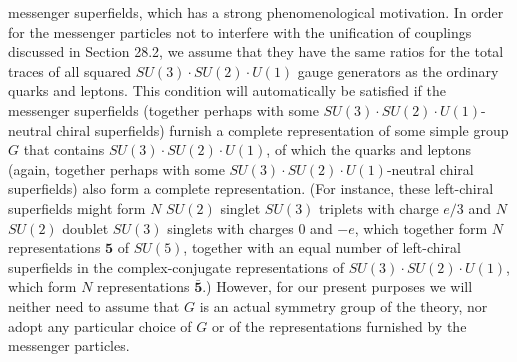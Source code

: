 
messenger superfields, which has a strong phenomenological motivation. In
order for the messenger particles not to interfere with the unification of
couplings discussed in Section 28.2, we assume that they have the same
ratios for the total traces of all squared
\(SU(3)\mathbin{\cdot}SU(2)\mathbin{\cdot}U(1)\) gauge generators as the
ordinary quarks and leptons. This condition will automatically be satisfied
if the messenger superfields (together perhaps with some
\(SU(3)\mathbin{\cdot}SU(2)\mathbin{\cdot}U(1)\)-neutral chiral
superfields) furnish a complete representation of some simple group \(G\)
that contains \(SU(3)\mathbin{\cdot}SU(2)\mathbin{\cdot}U(1)\), of which
the quarks and leptons (again, together perhaps with some
\(SU(3)\mathbin{\cdot}SU(2)\mathbin{\cdot}U(1)\)-neutral chiral
superfields) also form a complete representation. (For instance, these
left-chiral superfields might form \(N\) \(SU(2)\) singlet \(SU(3)\)
triplets with charge \(e/3\) and \(N\) \(SU(2)\) doublet \(SU(3)\) singlets
with charges 0 and \(-e\), which together form \(N\) representations
\(\mathbf{5}\) of \(SU(5)\), together with an equal number of left-chiral
superfields in the complex-conjugate representations of
\(SU(3)\mathbin{\cdot}SU(2)\mathbin{\cdot}U(1)\), which form \(N\)
representations \(\bar{\mathbf{5}}\).) However, for our present purposes we
will neither need to assume that \(G\) is an actual symmetry group of the
theory, nor adopt any particular choice of \(G\) or of the representations
furnished by the messenger particles.

